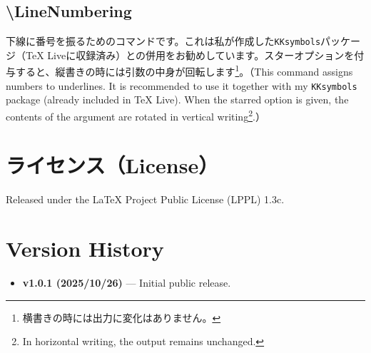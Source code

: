 \documentclass[luatex,fontsize=8pt,paper=b5,twoside]{jlreq}%
\begin{document}
\subsection{\textbackslash LineNumbering}
下線に番号を振るためのコマンドです。これは私が作成した\texttt{KKsymbols}パッケージ（TeX Liveに収録済み）との併用をお勧めしています。スターオプションを付与すると、縦書きの時には引数の中身が回転します\footnote{横書きの時には出力に変化はありません。}。（This command assigns numbers to underlines.
It is recommended to use it together with my \texttt{KKsymbols} package (already included in TeX Live).
When the starred option is given, the contents of the argument are rotated in vertical writing\footnote{In horizontal writing, the output remains unchanged.}.）



\section{ライセンス（License）}
Released under the LaTeX Project Public License (LPPL) 1.3c.

\section{Version History}
\begin{itemize}
  \item \textbf{v1.0.1 (2025/10/26)} --- Initial public release.
\end{itemize}
\end{document}
